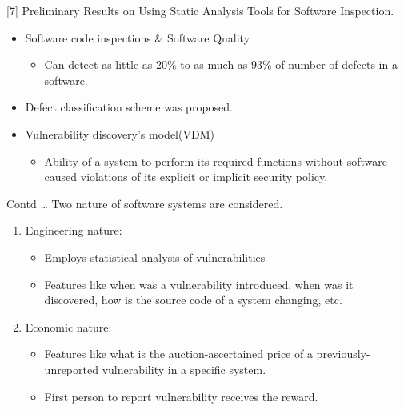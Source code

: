 \documentclass[xcolor=x11names,compress]{beamer}
\renewcommand{\(}{\begin{columns}}
\renewcommand{\)}{\end{columns}}
\newcommand{\<}[1]{\begin{column}{#1}}
\renewcommand{\>}{\end{column}}
\begin{document}
\begin{frame}{[7] Preliminary Results
		on Using Static Analysis Tools for Software Inspection.}
	\begin{itemize}
		\item Software code inspections \& Software Quality
		\begin{itemize}
			\item Can detect as little
			as 20\% to as much as 93\% of number of defects in a software.\newline
		\end{itemize}
		\item Defect classification scheme was proposed.\newline
		\item Vulnerability
		discovery’s model(VDM)
		\begin{itemize}
			\item Ability of a system to perform
			its required functions without software-caused violations of its explicit or implicit security
			policy.
			
		\end{itemize}
	
	\end{itemize}
\end{frame}
\begin{frame}{Contd \dots}
	Two nature of software systems are considered.
	\newline
		\begin{enumerate}
			\item Engineering nature:
			\begin{itemize}
				\item Employs statistical analysis of vulnerabilities
				\item  Features like when was a vulnerability introduced, when was it discovered, how is the source code of a system changing, etc.
				
			\end{itemize}
			\item Economic nature:
			\begin{itemize}
				\item Features like what is the auction-ascertained price of a previously-unreported vulnerability in a specific system.
				\item First person to report vulnerability receives the reward.
			\end{itemize}
		\end{enumerate} 

\end{frame}
\end{document}
